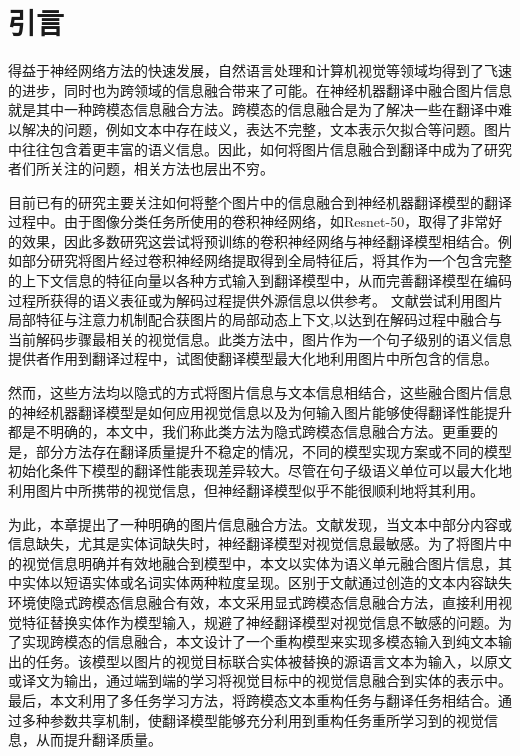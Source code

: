 \section{引言}
得益于神经网络方法的快速发展，自然语言处理和计算机视觉等领域均得到了飞速的进步，同时也为跨领域的信息融合带来了可能。在神经机器翻译中融合图片信息就是其中一种跨模态信息融合方法。跨模态的信息融合是为了解决一些在翻译中难以解决的问题，例如文本中存在歧义，表达不完整，文本表示欠拟合等问题。图片中往往包含着更丰富的语义信息。因此，如何将图片信息融合到翻译中成为了研究者们所关注的问题，相关方法也层出不穷。

目前已有的研究主要关注如何将整个图片中的信息融合到神经机器翻译模型的翻译过程中。由于图像分类任务所使用的卷积神经网络，如Resnet-50\cite{32_DBLP:conf/cvpr/HeZRS16}，取得了非常好的效果，因此多数研究这尝试将预训练的卷积神经网络与神经翻译模型相结合。例如部分研究将图片经过卷积神经网络提取得到全局特征后，将其作为一个包含完整的上下文信息的特征向量以各种方式输入到翻译模型中，从而完善翻译模型在编码过程所获得的语义表征或为解码过程提供外源信息以供参考\cite{52_DBLP:journals/corr/ElliottFH15,18_DBLP:conf/emnlp/CalixtoL17,22_li-etal-2021-vision,20_wu-etal-2021-good}。
文献\cite{36_calixto-etal-2017-doubly,47_DBLP:conf/wmt/LibovickyHM18}尝试利用图片局部特征与注意力机制配合获图片的局部动态上下文,以达到在解码过程中融合与当前解码步骤最相关的视觉信息。此类方法中，图片作为一个句子级别的语义信息提供者作用到翻译过程中，试图使翻译模型最大化地利用图片中所包含的信息。

然而，这些方法均以隐式的方式将图片信息与文本信息相结合，这些融合图片信息的神经机器翻译模型是如何应用视觉信息以及为何输入图片能够使得翻译性能提升都是不明确的，本文中，我们称此类方法为隐式跨模态信息融合方法。更重要的是，部分方法存在翻译质量提升不稳定的情况，不同的模型实现方案或不同的模型初始化条件下模型的翻译性能表现差异较大。尽管在句子级语义单位可以最大化地利用图片中所携带的视觉信息，但神经翻译模型似乎不能很顺利地将其利用。

为此，本章提出了一种明确的图片信息融合方法。文献\cite{53_caglayan-etal-2019-probing}发现，当文本中部分内容或信息缺失，尤其是实体词缺失时，神经翻译模型对视觉信息最敏感。为了将图片中的视觉信息明确并有效地融合到模型中，本文以实体为语义单元融合图片信息，其中实体以短语实体或名词实体两种粒度呈现。区别于文献\cite{53_caglayan-etal-2019-probing}通过创造的文本内容缺失环境使隐式跨模态信息融合有效，本文采用显式跨模态信息融合方法，直接利用视觉特征替换实体作为模型输入，规避了神经翻译模型对视觉信息不敏感的问题。为了实现跨模态的信息融合，本文设计了一个重构模型来实现多模态输入到纯文本输出的任务。该模型以图片的视觉目标联合实体被替换的源语言文本为输入，以原文或译文为输出，通过端到端的学习将视觉目标中的视觉信息融合到实体的表示中。最后，本文利用了多任务学习方法，将跨模态文本重构任务与翻译任务相结合。通过多种参数共享机制，使翻译模型能够充分利用到重构任务重所学习到的视觉信息，从而提升翻译质量。

